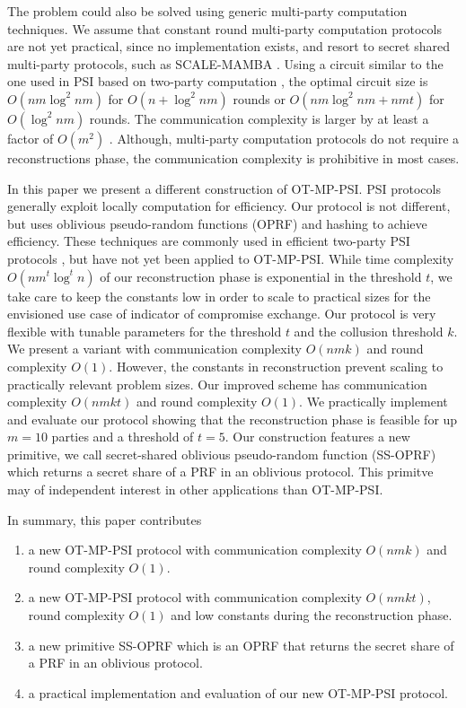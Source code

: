 \documentclass[10pt, sigconf]{acmart}
\begin{document}
The problem could also be solved using generic multi-party computation techniques.
We assume that constant round multi-party computation protocols \cite{lindell2019efficient,lindell2016more} are not yet practical, since no implementation exists, and resort to secret shared multi-party protocols, such as SCALE-MAMBA \cite{aly2020scale}.
Using a circuit similar to the one used in PSI based on two-party computation \cite{huang12private}, the optimal circuit size is $O(nm \log^2 nm)$ for $O(n + \log^2 nm)$ rounds or $O(nm \log^2 nm + nmt)$ for $O(\log^2 nm)$ rounds.
The communication complexity is larger by at least a factor of $O(m^2)$ \cite{damgaard2019communication}.
Although, multi-party computation protocols do not require a reconstructions phase, the communication complexity is prohibitive in most cases.

In this paper we present a different construction of OT-MP-PSI.
PSI protocols generally exploit locally computation for efficiency.
Our protocol is not different, but uses oblivious pseudo-random functions (OPRF) and hashing to achieve efficiency.
These techniques are commonly used in efficient two-party PSI protocols \cite{Freedman2016,Kolesnikov,Pinkas}, but have not yet been applied to OT-MP-PSI.
While time complexity $O(n m^t \log^t n)$ of our reconstruction phase is exponential in the threshold $t$, we take care to keep the constants low in order to scale to practical sizes for the envisioned use case of indicator of compromise exchange.
Our protocol is very flexible with tunable parameters for the threshold $t$ and the collusion threshold $k$.
We present a variant with communication complexity $O(nmk)$ and round complexity $O(1)$.
However, the constants in reconstruction prevent scaling to practically relevant problem sizes.
Our improved scheme has communication complexity $O(nmkt)$ and round complexity $O(1)$.
We practically implement and evaluate our protocol showing that the reconstruction phase is feasible for up $m = 10$ parties and a threshold of $t = 5$.
Our construction features a new primitive, we call secret-shared oblivious pseudo-random function (SS-OPRF) which returns a secret share of a PRF in an oblivious protocol.
This primitve may of independent interest in other applications than OT-MP-PSI.

In summary, this paper contributes

\begin{enumerate}

\item a new OT-MP-PSI protocol with communication complexity $O(nmk)$ and round complexity $O(1)$.

\item a new OT-MP-PSI protocol with communication complexity $O(nmkt)$, round complexity $O(1)$ and low constants during the reconstruction phase.

\item a new primitive SS-OPRF which is an OPRF that returns the secret share of a PRF in an oblivious protocol.

\item a practical implementation and evaluation of our new OT-MP-PSI protocol.

\end{enumerate}
\end{document}
